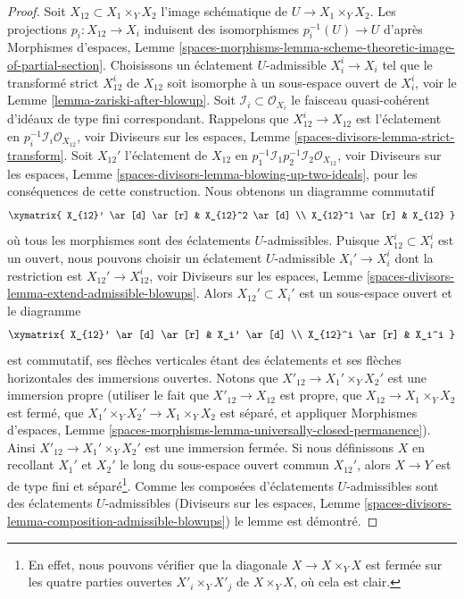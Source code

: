 \begin{proof}
\medskip\noindent
Soit $X_{12} \subset X_1 \times_Y X_2$ l'image schématique
de $U \to X_1 \times_Y X_2$. Les projections $p_i : X_{12} \to X_i$
induisent des isomorphismes $p_i^{-1}(U) \to U$ d'après
Morphismes d'espaces, Lemme
\ref{spaces-morphisms-lemma-scheme-theoretic-image-of-partial-section}.
Choisissons un éclatement $U$-admissible $X_i^i \to X_i$ tel que
le transformé strict $X_{12}^i$ de $X_{12}$ soit isomorphe à un
sous-espace ouvert de $X_i^i$, voir le
Lemme \ref{lemma-zariski-after-blowup}.
Soit $\mathcal{I}_i \subset \mathcal{O}_{X_i}$ le faisceau quasi-cohérent
d'idéaux de type fini correspondant.
Rappelons que $X_{12}^i \to X_{12}$ est l'éclatement en
$p_i^{-1}\mathcal{I}_i \mathcal{O}_{X_{12}}$, voir
Diviseurs sur les espaces, Lemme \ref{spaces-divisors-lemma-strict-transform}.
Soit $X_{12}'$ l'éclatement de $X_{12}$ en
$p_1^{-1}\mathcal{I}_1 p_2^{-1}\mathcal{I}_2 \mathcal{O}_{X_{12}}$, voir
Diviseurs sur les espaces, Lemme \ref{spaces-divisors-lemma-blowing-up-two-ideals},
pour les conséquences de cette construction. Nous obtenons un diagramme commutatif
$$
\xymatrix{
X_{12}' \ar[d] \ar[r] & X_{12}^2 \ar[d] \\
X_{12}^1 \ar[r] & X_{12}
}
$$
où tous les morphismes sont des éclatements $U$-admissibles. Puisque
$X_{12}^i \subset X_i^i$ est un ouvert, nous pouvons choisir un éclatement $U$-admissible
$X_i' \to X_i^i$ dont la restriction est $X_{12}' \to X_{12}^i$, voir
Diviseurs sur les espaces, Lemme
\ref{spaces-divisors-lemma-extend-admissible-blowups}.
Alors $X_{12}' \subset X_i'$ est un sous-espace ouvert et le diagramme
$$
\xymatrix{
X_{12}' \ar[d] \ar[r] & X_i' \ar[d] \\
X_{12}^i \ar[r] & X_i^i
}
$$
est commutatif, ses flèches verticales étant des éclatements et ses flèches horizontales
des immersions ouvertes. Notons que $X'_{12} \to X_1' \times_Y X_2'$ est
une immersion propre (utiliser le fait que $X'_{12} \to X_{12}$ est propre,
que $X_{12} \to X_1 \times_Y X_2$ est fermé, que $X_1' \times_Y X_2' \to
X_1 \times_Y X_2$ est séparé, et appliquer Morphismes d'espaces, Lemme
\ref{spaces-morphisms-lemma-universally-closed-permanence}).
Ainsi $X'_{12} \to  X_1' \times_Y X_2'$ est une immersion fermée.
Si nous définissons $X$ en recollant $X_1'$ et $X_2'$ le long du sous-espace
ouvert commun $X_{12}'$, alors $X \to Y$ est de type fini et
séparé\footnote{En effet, nous pouvons vérifier que la diagonale
$X \to X \times_Y X$ est fermée sur les quatre parties ouvertes $X'_i \times_Y X'_j$
de $X \times_Y X$, où cela est clair.}. Comme les composées
d'éclatements $U$-admissibles sont des éclatements $U$-admissibles
(Diviseurs sur les espaces, Lemme
\ref{spaces-divisors-lemma-composition-admissible-blowups})
le lemme est démontré.
\end{proof}


